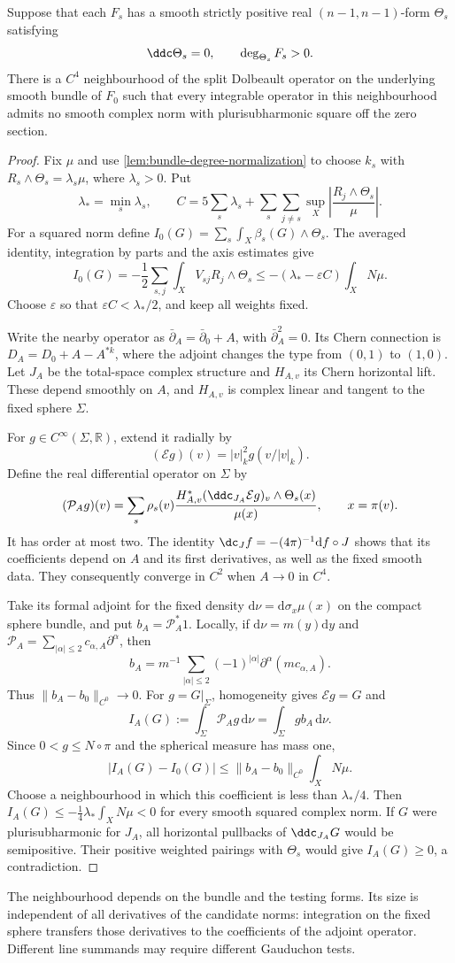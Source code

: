 \begin{theorem}\label{thm:convex-norm-deformation-obstruction}
Suppose that each $F_s$ has a smooth strictly positive real $(n-1,n-1)$-form $\Theta_s$ satisfying
\[
 \ddc\Theta_s=0,\qquad \deg_{\Theta_s}F_s>0.
\]
There is a $C^4$ neighbourhood of the split Dolbeault operator on the underlying smooth bundle of $F_0$ such that every integrable operator in this neighbourhood admits no smooth complex norm with plurisubharmonic square off the zero section.
\end{theorem}
\begin{proof}
Fix $\mu$ and use \cref{lem:bundle-degree-normalization} to choose $k_s$ with
$R_s\wedge\Theta_s=\lambda_s\mu$, where $\lambda_s>0$. Put
\[
 \lambda_* =\min_s\lambda_s,\qquad
 C=5\sum_s\lambda_s+
   \sum_s\sum_{j\ne s}\sup_X\left|\frac{R_j\wedge\Theta_s}{\mu}\right|.
\]
For a squared norm define $I_0(G)=\sum_s\int_X\beta_s(G)\wedge\Theta_s$. The averaged identity, integration by parts and the axis estimates give
\[
 I_0(G)=-\frac12\sum_{s,j}\int_XV_{sj}R_j\wedge\Theta_s
 \leq-(\lambda_* -\varepsilon C)\int_XN\mu.
\]
Choose $\varepsilon$ so that $\varepsilon C<\lambda_*/2$, and keep all weights fixed.

Write the nearby operator as $\bar\partial_A=\bar\partial_0+A$, with
$\bar\partial_A^2=0$. Its Chern connection is $D_A=D_0+A-A^{*k}$, where the adjoint changes the type from $(0,1)$ to $(1,0)$. Let $J_A$ be the total-space complex structure and $H_{A,v}$ its Chern horizontal lift. These depend smoothly on $A$, and $H_{A,v}$ is complex linear and tangent to the fixed sphere $\Sigma$.

For $g\in C^\infty(\Sigma,\mathbb R)$, extend it radially by
\[
 (\mathcal Eg)(v)=|v|_k^2g(v/|v|_k).
\]
Define the real differential operator on $\Sigma$ by
\[
 (\mathcal P_Ag)(v)=\sum_s\rho_s(v)
 \frac{H_{A,v}^*(\ddc_{J_A}\mathcal Eg)_v\wedge\Theta_s(x)}{\mu(x)},
 \qquad x=\pi(v).
\]
It has order at most two. The identity
$\dc_Jf=-(4\pi)^{-1}\mathrm df\circ J$ shows that its coefficients depend on $A$ and its first derivatives, as well as the fixed smooth data. They consequently converge in $C^2$ when $A\to0$ in $C^4$.

Take its formal adjoint for the fixed density
$\mathrm d\nu=\mathrm d\sigma_x\mu(x)$ on the compact sphere bundle, and put $b_A=\mathcal P_A^*1$. Locally, if
$\mathrm d\nu=m(y)\mathrm dy$ and
$\mathcal P_A=\sum_{|\alpha|\leq2}c_{\alpha,A}\partial^\alpha$, then
\[
 b_A=m^{-1}\sum_{|\alpha|\leq2}(-1)^{|\alpha|}
                 \partial^\alpha(mc_{\alpha,A}).
\]
Thus $\|b_A-b_0\|_{C^0}\to0$.
For $g=G|_\Sigma$, homogeneity gives $\mathcal Eg=G$ and
\[
 I_A(G):=\int_\Sigma\mathcal P_Ag\,\mathrm d\nu
        =\int_\Sigma gb_A\,\mathrm d\nu.
\]
Since $0<g\leq N\circ\pi$ and the spherical measure has mass one,
\[
 |I_A(G)-I_0(G)|
 \leq\|b_A-b_0\|_{C^0}\int_XN\mu.
\]
Choose a neighbourhood in which this coefficient is less than $\lambda_*/4$. Then
$I_A(G)\leq-\frac14\lambda_*\int_XN\mu<0$ for every smooth squared complex norm. If $G$ were plurisubharmonic for $J_A$, all horizontal pullbacks of $\ddc_{J_A}G$ would be semipositive. Their positive weighted pairings with $\Theta_s$ would give $I_A(G)\geq0$, a contradiction.
\end{proof}

The neighbourhood depends on the bundle and the testing forms. Its size is independent of all derivatives of the candidate norms: integration on the fixed sphere transfers those derivatives to the coefficients of the adjoint operator. Different line summands may require different Gauduchon tests.
